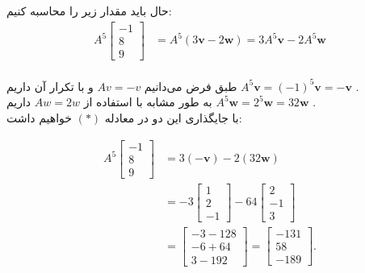\documentclass{article}
\begin{document}
\begin{Answer}
حال باید مقدار زیر را محاسبه کنیم:
	\begin{align*} 
		A^5\begin{bmatrix} 
			-1 \\ 
			8 \\ 
			9 
		\end{bmatrix}&=A^5(3\mathbf{v}-2\mathbf{w})=3A^5\mathbf{v}-2A^5\mathbf{w} \tag{*} 
	\end{align*}\\
طبق فرض می‌دانیم $Av=-v$ و با تکرار آن داریم $A^5\mathbf{v}=(-1)^5\mathbf{v}=-\mathbf{v}$ .\\
به طور مشابه با استفاده از $Aw=2w$ داریم $A^5\mathbf{w}=2^5\mathbf{w}=32\mathbf{w}$ .\\	
با جایگذاری این دو در معادله $(*)$ خواهیم داشت:
	\begin{leftflush}
	\begin{align*} 
		A^5\begin{bmatrix} 
			-1 \\ 
			8 \\ 
			9 
		\end{bmatrix}&=3(-\mathbf{v})-2(32\mathbf{w})\\[6pt]
		&=-3\begin{bmatrix} 
			1 \\ 
			2 \\ 
			-1 
		\end{bmatrix}-64\begin{bmatrix} 
			2 \\ 
			-1 \\ 
			3 
		\end{bmatrix}\\[6pt]
		&=\begin{bmatrix} 
			-3-128 \\ 
			-6+64 \\ 
			3-192 
		\end{bmatrix} 
		=\begin{bmatrix} 
			-131 \\ 
			58 \\ 
			-189 
		\end{bmatrix}. 
	\end{align*}
	\end{leftflush}
	\end{Answer}
	
\end{document}
